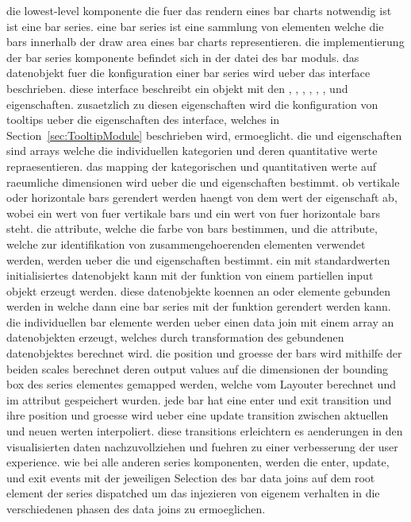 die lowest-level komponente die fuer das rendern eines bar charts notwendig ist ist eine bar series.
eine bar series ist eine sammlung von  elementen welche die bars innerhalb der draw area eines bar charts representieren.
die implementierung der bar series komponente befindet sich in der  datei des bar moduls.
das datenobjekt fuer die konfiguration einer bar series wird ueber das  interface beschrieben.
diese interface beschreibt ein objekt mit den , , , , , , und  eigenschaften.
zusaetzlich zu diesen eigenschaften wird die konfiguration von tooltips ueber die eigenschaften des  interface, welches in Section~\ref{sec:TooltipModule} beschrieben wird, ermoeglicht.
die  und  eigenschaften sind arrays welche die individuellen kategorien und deren quantitative werte repraesentieren.
das mapping der kategorischen und quantitativen werte auf raeumliche dimensionen wird ueber die  und  eigenschaften bestimmt.
ob vertikale oder horizontale bars gerendert werden haengt von dem wert der  eigenschaft ab, wobei ein wert von  fuer vertikale bars und ein wert von  fuer horizontale bars steht.
die  attribute, welche die farbe von bars bestimmen, und die  attribute, welche zur identifikation von zusammengehoerenden elementen verwendet werden, werden ueber die  und  eigenschaften bestimmt.
ein mit standardwerten initialisiertes  datenobjekt kann mit der  funktion von einem partiellen input objekt erzeugt werden.
diese datenobjekte koennen an  oder  elemente gebunden werden in welche dann eine bar series mit der  funktion gerendert werden kann.
die individuellen bar elemente werden ueber einen data join mit einem array an  datenobjekten erzeugt, welches durch transformation des gebundenen  datenobjektes berechnet wird.
die position und groesse der bars wird mithilfe der beiden scales berechnet deren output values auf die dimensionen der bounding box des series elementes gemapped werden, welche vom Layouter berechnet und im  attribut gespeichert wurden.
jede bar hat eine enter und exit transition und ihre position und groesse wird ueber eine update transition zwischen aktuellen und neuen werten interpoliert.
diese transitions erleichtern es aenderungen in den visualisierten daten nachzuvollziehen und fuehren zu einer verbesserung der user experience.
wie bei alle anderen series komponenten, werden die enter, update, und exit events mit der jeweiligen Selection des bar data joins auf dem root element der series dispatched um das injezieren von eigenem verhalten in die verschiedenen phasen des data joins zu ermoeglichen. 

